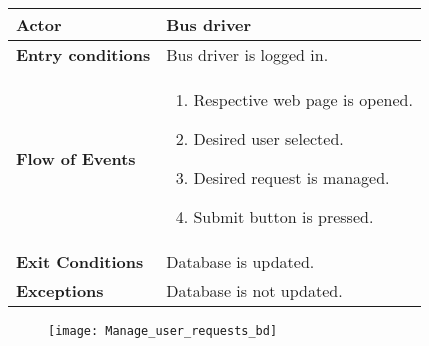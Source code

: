 \begin{itemize}
\begin{table}[H]
\begin{tabular}{| m{3.5cm} | m{9.5cm} |}
			\hline
			\textbf{Actor} & Bus driver\\
			\hline
			\textbf{Entry conditions} & Bus driver is logged in.\\
			\hline
			\textbf{Flow of Events} & 
			\begin{enumerate}
				\item Respective web page is opened. 
				\item Desired user selected. 
				\item Desired request is managed. 
				\item Submit button is pressed.
			\end{enumerate}\\
			\hline
			\textbf{Exit Conditions} & Database is updated.\\
			\hline
			\textbf{Exceptions} & Database is not updated.\\
			\hline
		\end{tabular}
	\end{table}
\begin{figure}[H]
	\centering
	\texttt{[image: Manage\_user\_requests\_bd]}
\end{figure}
\end{itemize}
\newpage
